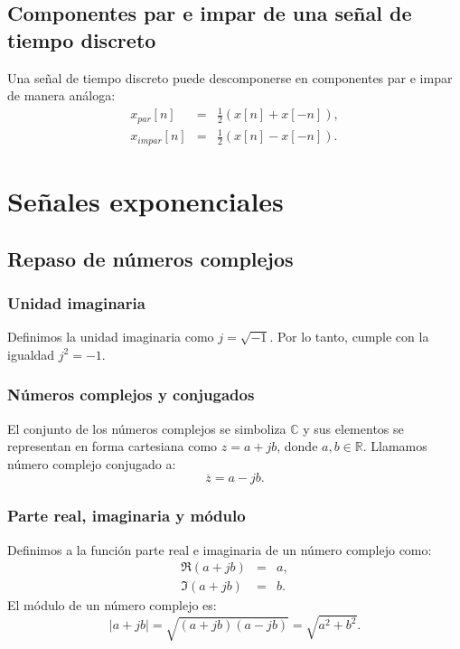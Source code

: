 \documentclass[11pt,a4paper,openany]{book}
\begin{document}
\subsection{Componentes par e impar de una señal de tiempo discreto}
Una señal de tiempo discreto puede descomponerse en componentes par e impar de manera análoga:
\begin{eqnarray}
	x_{par}[n] &=& \frac{1}{2}\left( x[n] + x[-n] \right) , \\
	x_{impar}[n] &=& \frac{1}{2}\left( x[n] - x[-n] \right) .
\end{eqnarray}

\section{Señales exponenciales}

\subsection{Repaso de números complejos}

\subsubsection{Unidad imaginaria}
Definimos la unidad imaginaria como $j = \sqrt{-1}$. Por lo tanto, cumple con la igualdad $j^{2} = -1$.

\subsubsection{Números complejos y conjugados}
El conjunto de los números complejos se simboliza $\mathbb{C}$ y sus elementos se representan en forma cartesiana como $z = a + j b$, donde $a, b \in \mathbb{R}$. Llamamos número complejo conjugado a:
\begin{equation}
	\overline{z} = a - j b.
\end{equation}

\subsubsection{Parte real, imaginaria y módulo}
Definimos a la función parte real e imaginaria de un número complejo como:
\begin{eqnarray}
	\Re(a + j b) &=& a, \\
	\Im(a + j b) &=& b.
\end{eqnarray}
El módulo de un número complejo es:
\begin{equation}
	|a + j b| = \sqrt{(a + j b)(a - j b)} = \sqrt{a^{2} + b^{2}}.
\end{equation}
\end{document}
